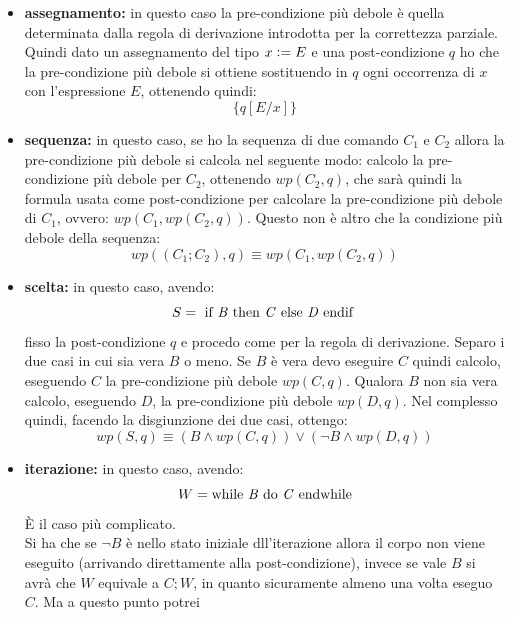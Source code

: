 				      				\begin{itemize}
				      					\item \textbf{assegnamento:} in questo caso la pre-condizione più debole è
				      					      quella determinata dalla regola di derivazione introdotta per la correttezza
				      					      parziale. Quindi dato un assegnamento del tipo $x\cceq E$ e una post-condizione
				      					      $q$ ho che la pre-condizione più debole si ottiene sostituendo in $q$ ogni
				      					      occorrenza di $x$ con l'espressione $E$, ottenendo quindi:
				      					      \[\{q[E/x]\}\]
				      					\item \textbf{sequenza:} in questo caso, se ho la sequenza di due comando
				      					      $C_1$ e $C_2$ allora la pre-condizione più debole si calcola nel seguente modo:
				      					      calcolo la pre-condizione più debole per $C_2$, ottenendo $wp(C_2, q)$, che sarà
				      					      quindi la formula usata come post-condizione per calcolare la pre-condizione più
				      					      debole di $C_1$, ovvero: $wp(C_1, wp(C_2, q))$. Questo non è altro che la
				      					      condizione più debole della sequenza:
				      					      \[wp((C_1;C_2), q)\equiv wp(C_1, wp(C_2, q))\]
				      					\item \textbf{scelta:} in questo caso, avendo:
				      					      \[S=\mbox{ if \textit{B} then \textit{C} else \textit{D} endif }\]
				      					      fisso la post-condizione $q$ e procedo come per la regola di
				      					      derivazione. Separo i due casi in cui sia vera $B$ o meno. Se $B$ è vera devo
				      					      eseguire $C$ quindi calcolo, eseguendo $C$ la pre-condizione più debole
				      					      $wp(C, q)$. Qualora $B$ non sia vera calcolo, eseguendo $D$, la pre-condizione
				      					      più debole $wp(D, q)$. Nel complesso quindi, facendo la disgiunzione dei due
				      					      casi, ottengo: 
				      					      \[wp(S, q)\equiv(B\land wp(C, q))\lor (\neg B\land wp(D, q))\]
				      					\item \textbf{iterazione:} in questo caso, avendo:
				      					      \[W=\mbox{while \textit{B} do \textit{C} endwhile}\]
				      					      È il caso più complicato.\\
				      					      Si ha che se $\neg B$ è nello stato iniziale dll'iterazione allora il corpo
				      					      non viene eseguito (arrivando direttamente alla post-condizione), invece se
				      					      vale $B$ si avrà che $W$ equivale a $C;W$, in 
				      					      quanto sicuramente almeno una volta eseguo $C$. Ma a questo punto potrei

\end{itemize}

